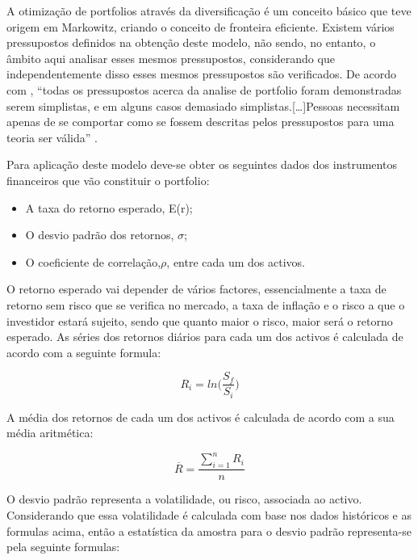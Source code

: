 \documentclass[
  12pt,
  a4paper,
  openany]{book}
\providecommand{\tightlist}{%
  \setlength{\itemsep}{0pt}\setlength{\parskip}{0pt}}
\begin{document}
A otimização de portfolios através da diversificação é um conceito básico que teve origem em Markowitz, criando o conceito de fronteira eficiente. Existem vários pressupostos definidos na obtenção deste modelo, não sendo, no entanto, o âmbito aqui analisar esses mesmos pressupostos, considerando que independentemente disso esses mesmos pressupostos são verificados. De acordo com \citet{Modern2013}, ``todas os pressupostos acerca da analise de portfolio foram demonstradas serem simplistas, e em alguns casos demasiado simplistas.{[}\ldots{]}Pessoas necessitam apenas de se comportar como se fossem descritas pelos pressupostos para uma teoria ser válida'' \citep[pp.5]{Modern2013}.

Para aplicação deste modelo deve-se obter os seguintes dados dos instrumentos financeiros que vão constituir o portfolio:

\begin{itemize}
\tightlist
\item
  A taxa do retorno esperado, E(r);
\item
  O desvio padrão dos retornos, \(\sigma\);
\item
  O coeficiente de correlação,\(\rho\), entre cada um dos activos.
\end{itemize}

O retorno esperado vai depender de vários factores, essencialmente a taxa de retorno sem risco que se verifica no mercado, a taxa de inflação e o risco a que o investidor estará sujeito, sendo que quanto maior o risco, maior será o retorno esperado.
As séries dos retornos diários para cada um dos activos é calculada de acordo com a seguinte formula:

\begin{equation} 
  R_i = ln\Big(\frac{S_f}{S_i}\Big)
  \label{eq:logRet}
\end{equation}

A média dos retornos de cada um dos activos é calculada de acordo com a sua média aritmética:

\begin{equation} 
  \overline{R} = \frac{\displaystyle\sum_{i=1}^n R_i}{n}
  \label{eq:meanRet}
\end{equation}

O desvio padrão representa a volatilidade, ou risco, associada ao activo. Considerando que essa volatilidade é calculada com base nos dados históricos e as formulas acima, então a estatística da amostra para o desvio padrão representa-se pela seguinte formulas:
\end{document}
